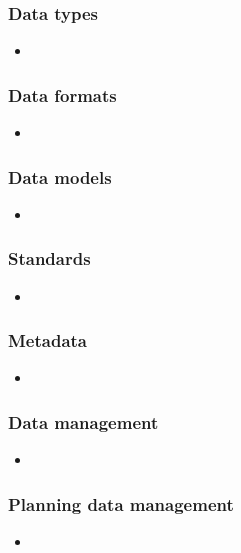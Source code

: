 \documentclass{beamer}
\begin{document}
\begin{frame}
  \frametitle{Data types}
  
  \begin{itemize}
  \item 
  \end{itemize}
\end{frame}

\begin{frame}
  \frametitle{Data formats}
  
  \begin{itemize}
  \item 
  \end{itemize}
\end{frame}

\begin{frame}
  \frametitle{Data models}
  
  \begin{itemize}
  \item 
  \end{itemize}
\end{frame}

\begin{frame}
  \frametitle{Standards}
  
  \begin{itemize}
  \item 
  \end{itemize}
\end{frame}

\begin{frame}
  \frametitle{Metadata}
  
  \begin{itemize}
  \item 
  \end{itemize}
\end{frame}

\begin{frame}
  \frametitle{Data management}
  
  \begin{itemize}
  \item 
  \end{itemize}
\end{frame}

\begin{frame}
  \frametitle{Planning data management}
  
  \begin{itemize}
  \item 
  \end{itemize}
\end{frame}
\end{document}
